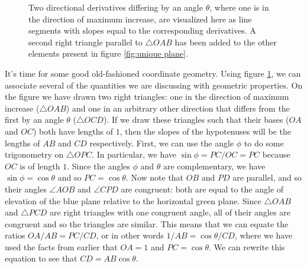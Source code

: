 \documentclass{myarticle}
\theoremstyle{nospace}
\newtheorem{old series theorem}{Theorem}
\newenvironment{series theorem}{\begin{mdframed}\begin{old series theorem}}{\end{old series theorem}\end{mdframed}}
\begin{document}
\begin{figure}[htb!]
\caption{Two directional derivatives differing by an angle $\theta$, where one is in the direction of maximum increase, are visualized here as line segments with slopes equal to the corresponding derivatives. A second right triangle parallel to $\bigtriangleup OAB$ has been added to the other elements present in figure \ref{fig:unique plane}.}
\label{fig:gradient geometry}
\end{figure}

It's time for some good old-fashioned coordinate geometry. Using figure \ref{fig:gradient geometry}, we can associate several of the quantities we are discussing with geometric properties. On the figure we have drawn two right triangles: one in the direction of maximum increase ($\bigtriangleup OAB$) and one in an arbitrary other direction that differs from the first by an angle $\theta$ ($\bigtriangleup OCD$). If we draw these triangles such that their bases ($OA$ and $OC$) both have lengths of $1$, then the slopes of the hypotenuses will be the lengths of $AB$ and $CD$ respectively. First, we can use the angle $\phi$ to do some trigonometry on $\bigtriangleup OPC$. In particular, we have $\sin \phi = PC/OC = PC$ because $OC$ is of length $1$. Since the angles $\phi$ and $\theta$ are complementary, we have $\sin \phi = \cos \theta$ and so $PC = \cos \theta$. Now note that $OB$ and $PD$ are parallel, and so their angles $\angle AOB$ and $\angle CPD$ are congruent: both are equal to the angle of elevation of the blue plane relative to the horizontal green plane. Since $\bigtriangleup OAB$ and $\bigtriangleup PCD$ are right triangles with one congruent angle, all of their angles are congruent and so the triangles are similar. This means that we can equate the ratios $OA/AB = PC/CD$, or in other words $1/AB = \cos \theta/CD$, where we have used the facts from earlier that $OA = 1$ and $PC = \cos \theta$. We can rewrite this equation to see that $CD = AB \cos \theta$.
\end{document}
